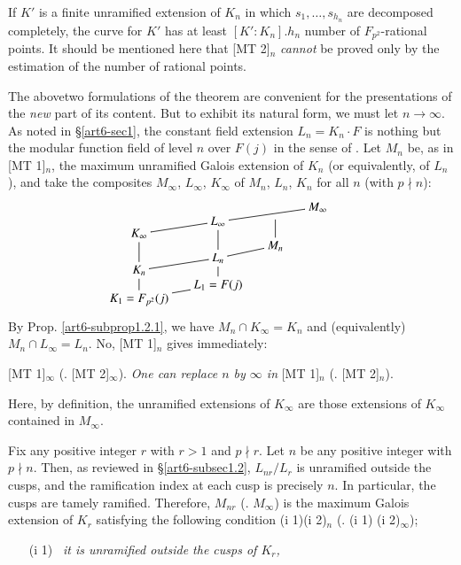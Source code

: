 \begin{remark}\label{art6-rem2}
If $K'$ is a finite unramified extension of $K_n$ in which $s_1, \ldots, s_{h_n}$ are decomposed completely, the curve for $K'$ has at least $[K': K_n]. h_n$ number of $F_{p^2}$-rational points. It should be mentioned here that [MT 2]$_n$ \textit{cannot} be proved only by the estimation of the number of rational points.

The above\pageoriginale two formulations of the theorem are convenient for the presentations of the \textit{new} part of its content. But to exhibit its natural form, we must let $n \to \infty$. As noted in \S \ref{art6-sec1}, the constant field extension $L_n = K_n \cdot F$ is nothing but the modular function field of level $n$ over $F(j)$ in the sense of \cite{art6-key5}. Let $M_n$ be, as in [MT 1]$_n$, the maximum unramified Galois extension of $K_n$ (or equivalently, of $L_n$), and take the composites $M_\infty$, $L_\infty$, $K_\infty$ of $M_n$, $L_n$, $K_n$ for all $n$ (with $p\nmid n$):
$$
\xymatrix@R=-0.15cm@C=0.5cm{
& & & M_\infty \ar@{-}[ddll]\\
& & \ar@{-}[ddd] &\\
& L_\infty \ar@{-}[ddd]& &\\
K_\infty\ar@{-}[ddd]\ar@{-}[ur] & & &\\
& & M_n \ar@{-}[dl] &\\
& L_n \ar@{-}[ddd]& &\\
K_n \ar@{-}[ddd]\ar@{-}[ur] & & &\\
& & &&\\
& L_1 = F (j) & &\\
K_1 = F_{p^2} (j)\ar@{-}[ur] & & &
}
$$
By Prop. \ref{art6-subprop1.2.1}, we have $M_n \cap K_\infty = K_n$ and (equivalently) $M_n \cap L_\infty =L_n$. No, [MT 1]$_n$ gives immediately:

[MT 1]$_\infty$ (\resp. [MT 2]$_\infty$). \textit{One can replace $n$ by $\infty$ in} [MT 1]$_n$ (\resp. [MT 2]$_n$).

Here, by definition, the unramified extensions of $K_\infty$ are those extensions of $K_\infty$ contained in $M_\infty$.

Fix any positive integer $r$ with $r > 1$ and $p \nmid r$. Let $n$ be any positive integer with $p \nmid n$. Then, as reviewed in \S \ref{art6-subsec1.2}, $L_{nr}/ L_r$ is unramified outside the cusps, and the ramification index at each cusp is precisely $n$. In particular, the cusps are tamely ramified. Therefore, $M_{nr}$ (\resp. $M_\infty$) is the maximum Galois extension of $K_r$ satisfying the following condition (i 1)(i 2)$_n$ (\resp. (i 1) (i 2)$_\infty$);
\begin{itemize}
\item[(i 1)~] \textit{it is unramified outside the cusps of $K_r$,}


\end{itemize}
\end{remark}

